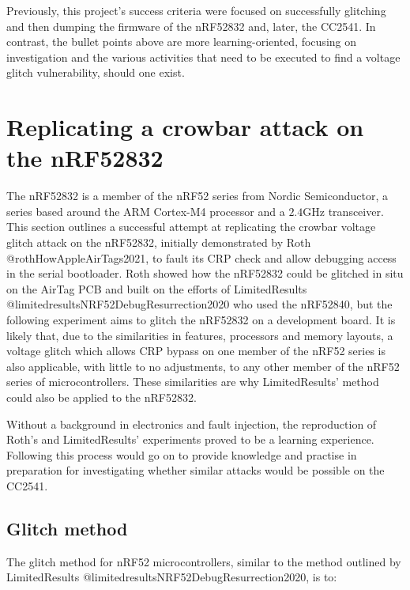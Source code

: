 Previously, this project's success criteria were focused on successfully
glitching and then dumping the firmware of the nRF52832 and, later, the
CC2541. In contrast, the bullet points above are more learning-oriented,
focusing on investigation and the various activities that need to be
executed to find a voltage glitch vulnerability, should one exist.

\hypertarget{replicating-a-crowbar-attack-on-the-nrf52832}{%
\section{Replicating a crowbar attack on the
nRF52832}\label{replicating-a-crowbar-attack-on-the-nrf52832}}

The nRF52832 is a member of the nRF52 series from Nordic Semiconductor,
a series based around the ARM Cortex-M4 processor and a
\(2.4\si{\giga\hertz}\) transceiver. This section outlines a successful
attempt at replicating the crowbar voltage glitch attack on the
nRF52832, initially demonstrated by Roth @rothHowAppleAirTags2021, to
fault its CRP check and allow debugging access in the serial bootloader.
Roth showed how the nRF52832 could be glitched in situ on the AirTag PCB
and built on the efforts of LimitedResults
@limitedresultsNRF52DebugResurrection2020 who used the nRF52840, but the
following experiment aims to glitch the nRF52832 on a development board.
It is likely that, due to the similarities in features, processors and
memory layouts, a voltage glitch which allows CRP bypass on one member
of the nRF52 series is also applicable, with little to no adjustments,
to any other member of the nRF52 series of microcontrollers. These
similarities are why LimitedResults' method could also be applied to the
nRF52832.

Without a background in electronics and fault injection, the
reproduction of Roth's and LimitedResults' experiments proved to be a
learning experience. Following this process would go on to provide
knowledge and practise in preparation for investigating whether similar
attacks would be possible on the CC2541.

\hypertarget{glitch-method}{%
\subsection{Glitch method}\label{glitch-method}}

The glitch method for nRF52 microcontrollers, similar to the method
outlined by LimitedResults @limitedresultsNRF52DebugResurrection2020, is
to:

